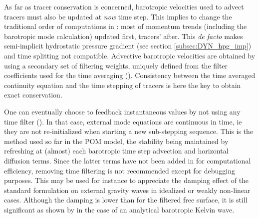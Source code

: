 \documentclass[../tex_main/NEMO_manual]{subfiles}
\begin{document}

As far as tracer conservation is concerned, barotropic velocities used to advect tracers must also be updated 
at \textit{now} time step. This implies to change the traditional order of computations in \NEMO: most of momentum  
trends (including the barotropic mode calculation) updated first, tracers' after. This \textit{de facto} makes semi-implicit hydrostatic 
pressure gradient (see section \autoref{subsec:DYN_hpg_imp}) and time splitting not compatible. 
Advective barotropic velocities are obtained by using a secondary set of filtering weights, uniquely defined from the filter 
coefficients used for the time averaging (\citet{Shchepetkin_McWilliams_OM05}). Consistency between the time averaged continuity equation and the time stepping of tracers is here the key to obtain exact conservation.


One can eventually choose to feedback instantaneous values by not using any time filter (). 
In that case, external mode equations are continuous in time, ie they are not re-initialized when starting a new 
sub-stepping sequence. This is the method used so far in the POM model, the stability being maintained by refreshing at (almost) 
each barotropic time step advection and horizontal diffusion terms. Since the latter terms have not been added in \NEMO for 
computational efficiency, removing time filtering is not recommended except for debugging purposes. 
This may be used for instance to appreciate the damping effect of the standard formulation on external gravity waves in idealized or weakly non-linear cases. Although the damping is lower than for the filtered free surface, it is still significant as shown by \citet{Levier2007} in the case of an analytical barotropic Kelvin wave.
\end{document}
